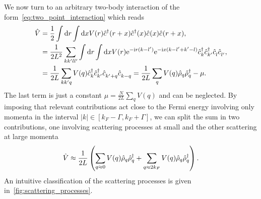We now turn to an arbitrary two-body interaction of the form~\cref{eq:two_point_interaction} which reads
\begin{align}
    \hat V
    &= \frac12\int\rd r\int\rd x V(r)\hat c^\dag(r+x)\hat c^\dag(x)\hat c^\pdag(x)\hat c^\pdag(r+x),
    \\
    &= \frac1{2L^2}\sum_{kk'll'}\int\rd r\int\rd x V(r)\re^{-\ri r(k-l')}\re^{-\ri x(k-l'+k'-l)}\hat c^\dag_k\hat c^\dag_{k'}\hat c^\pdag_l\hat c^\pdag_{l'},
    \\
    &= \frac1{2L}\sum_{kk'q}V(q)\hat c^\dag_k\hat c^\dag_{k'}\hat c^\pdag_{k'+q}\hat c^\pdag_{k-q}
    = \frac1{2L}\sum_{q}V(q)\hat\rho_q\hat\rho^\dag_{q} - \mu.
    \label{eq:two_body_interaction_momentum_space}
\end{align}
The last term is just a constant $\mu = \frac N{2L}\sum_qV(q)$ and can be neglected.
By imposing that relevant contributions act close to the Fermi energy involving only momenta in the interval $|k|\in[k_F-\Gamma,k_F+\Gamma]$, we can split the sum in two contributions, one involving scattering processes at small and the other scattering at large momenta
\begin{align}
    \hat V \approx \frac1{2L}\left( \sum_{q\approx0}V(q)\hat\rho_{q}\hat\rho^\dag_{q} + \sum_{q\approx2k_F}V(q)\hat\rho_{q}\hat\rho^\dag_{q} \right).
\end{align}
An intuitive classification of the scattering processes is given in~\cref{fig:scattering_processes}.
